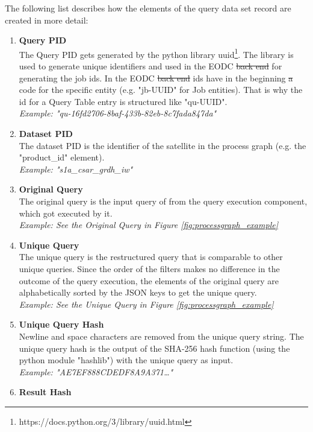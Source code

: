 \documentclass[draft,final]{vutinfth} %
\providecommand{\DIFaddtex}[1]{{\protect\color{blue}\uwave{#1}}} %
\providecommand{\DIFdeltex}[1]{{\protect\color{red}\sout{#1}}}                      %
\providecommand{\DIFaddbegin}{} %
\providecommand{\DIFaddend}{} %
\providecommand{\DIFdelbegin}{} %
\providecommand{\DIFdelend}{} %
\providecommand{\DIFadd}[1]{\texorpdfstring{\DIFaddtex{#1}}{#1}} %
\providecommand{\DIFdel}[1]{\texorpdfstring{\DIFdeltex{#1}}{}} %
\begin{document}
The following list describes how the elements of the query data set record are created in more detail:

\begin{enumerate}
	\item \textbf{Query PID} \\
	The Query PID gets generated by the python library uuid\footnote{https://docs.python.org/3/library/uuid.html}. The library is used to generate unique identifiers and used in the EODC \DIFdelbegin \DIFdel{back end }\DIFdelend \DIFaddbegin \DIFadd{backend }\DIFaddend for generating the job ids. In the EODC \DIFdelbegin \DIFdel{back end }\DIFdelend \DIFaddbegin \DIFadd{backend }\DIFaddend ids have in the beginning \DIFdelbegin \DIFdel{a }\DIFdelend code for the specific entity (e.g. "jb-UUID" for Job entities). That is why the id for a Query Table entry is structured like "qu-UUID". \\
	\textit{Example: "qu-16fd2706-8baf-433b-82eb-8c7fada847da"}
	\item \textbf{Dataset PID} \\
	The dataset PID is the identifier of the satellite in the process graph (e.g. the "product\_id" element). \\
	\textit{Example: "s1a\_csar\_grdh\_iw"}	    	
	\item\textbf{Original Query} \\
	The original query is the input query of from the query execution component, which got executed by it.  \\ 
	\textit{Example: See the Original Query in Figure \ref{fig:processgraph_example}}	 
	\item \textbf{Unique Query} \\
	The unique query is the restructured query that is comparable to other unique queries. Since the order of the filters makes no difference in the outcome of the query execution, the elements of the original query are alphabetically sorted by the JSON keys to get the unique query. \\
	\textit{Example: See the Unique Query in Figure \ref{fig:processgraph_example}}	  	 	
	\item \textbf{Unique Query Hash} \\ 
	Newline and space characters are removed from the unique query string. The unique query hash is the output of the SHA-256 hash function (using the python module "hashlib") with the unique query as input.  \\
	\textit{Example: "AE7EF888CDEDF8A9A371\dots"} 
	\item \textbf{Result Hash} \\

\end{enumerate}
\end{document}
